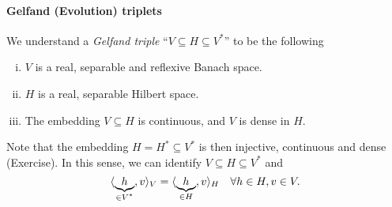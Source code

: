 \documentclass[../skript.tex]{subfiles}
\begin{document}
\paragraph{Gelfand (Evolution) triplets}
\begin{definition} %
\label{def:c3e12}
We understand a \emph{Gelfand triple} ``$V \subseteq H \subseteq V^*$'' to be the following
\begin{enumerate}[(i)]
\item $V$ is a real, separable and reflexive Banach space.
\item $H$ is a real, separable Hilbert space.
\item The embedding $V \subseteq H$ is continuous, and $V$ is dense in $H$.
\end{enumerate}
\end{definition}
Note that the embedding $H = H^* \subseteq V^*$ is then injective, continuous and dense (Exercise). In this sense, we can identify $V \subseteq H \subseteq V^*$ and
\begin{equation}
\opttag{$\star$}
\label{eq:c3e2-star}
\langle \underbrace{h}_{\mathclap{\in V^*}}, v \rangle_V = \langle \underbrace{h}_{\mathclap{\in H}}, v \rangle_H \quad \forall h \in H, v \in V.
\end{equation}
\end{document}
